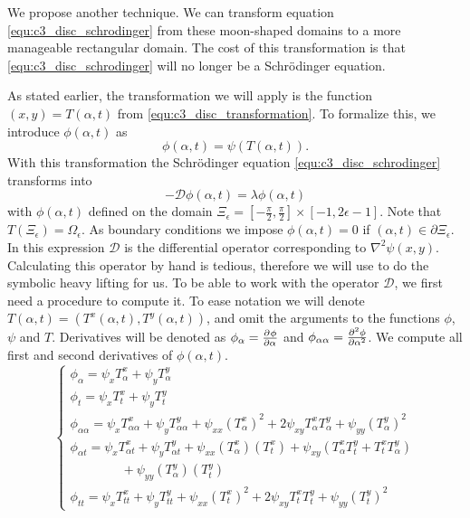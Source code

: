 We propose another technique. We can transform equation \eqref{equ:c3_disc_schrodinger} from these moon-shaped domains to a more manageable rectangular domain. The cost of this transformation is that \eqref{equ:c3_disc_schrodinger} will no longer be a Schrödinger equation.

As stated earlier, the transformation we will apply is the function $(x, y) = T(\alpha, t)$ from \eqref{equ:c3_disc_transformation}. To formalize this, we introduce $\phi(\alpha, t)$ as
$$
  \phi(\alpha, t) = \psi(T(\alpha, t))\text{.}
$$
With this transformation the Schrödinger equation \eqref{equ:c3_disc_schrodinger} transforms into
\begin{equation}\label{equ:c3_disc_schrodinger_transformed}
  -\mathcal{D}\phi(\alpha, t) = \lambda\phi(\alpha, t)
\end{equation}
with $\phi(\alpha, t)$ defined on the domain $\Xi_\epsilon = \left[-\frac{\pi}{2}, \frac{\pi}{2}\right] \times [-1, 2\epsilon - 1]$. Note that $T(\Xi_\epsilon) = \Omega_\epsilon$. As boundary conditions we impose $\phi(\alpha, t) = 0$ if $(\alpha, t) \in \partial\Xi_\epsilon$. In this expression $\mathcal{D}$ is the differential operator corresponding to $\nabla^2\psi(x, y)$. Calculating this operator by hand is tedious, therefore we will use \sage{} to do the symbolic heavy lifting for us. To be able to work with the operator $\mathcal{D}$, we first need a procedure to compute it. To ease notation we will denote $T(\alpha, t) = (T^{x}(\alpha, t), T^{y}(\alpha, t))$, and omit the arguments to the functions $\phi$, $\psi$ and $T$. Derivatives will be denoted as $\phi_\alpha = \pdv[]{\phi}{\alpha}$ and $\phi_{\alpha\alpha} = \pdv[2]{\phi}{\alpha}$. We compute all first and second derivatives of $\phi(\alpha, t)$.
\begin{equation}\label{equ:disc_transformation_derivatives}
  \begin{cases}
    \phi_\alpha = \psi_x T^x_\alpha + \psi_y T^y_\alpha                                                                                                                   \\
    \phi_t = \psi_x T^x_t + \psi_y T^y_t                                                                                                                                  \\
    \phi_{\alpha\alpha} = \psi_x T^x_{\alpha\alpha} + \psi_y T^y_{\alpha\alpha} + \psi_{xx} (T^x_\alpha)^2 + 2 \psi_{xy} T^x_\alpha T^y_\alpha + \psi_{yy} (T^y_\alpha)^2 \\
    \phi_{\alpha t} = \psi_x T^x_{\alpha t} + \psi_y T^y_{\alpha t} + \psi_{xx} (T^x_\alpha)(T^x_t) + \psi_{xy} \left(T^x_\alpha T^y_t + T^x_t T^y_\alpha \right)         \\
    \quad\quad\quad\quad {} + \psi_{yy} (T^y_\alpha)(T^y_t)                                                                                                               \\
    \phi_{tt} = \psi_x T^x_{tt} + \psi_y T^y_{tt} + \psi_{xx} (T^x_t)^2 + 2 \psi_{xy} T^x_t T^y_t + \psi_{yy} (T^y_t)^2
  \end{cases}
\end{equation}

